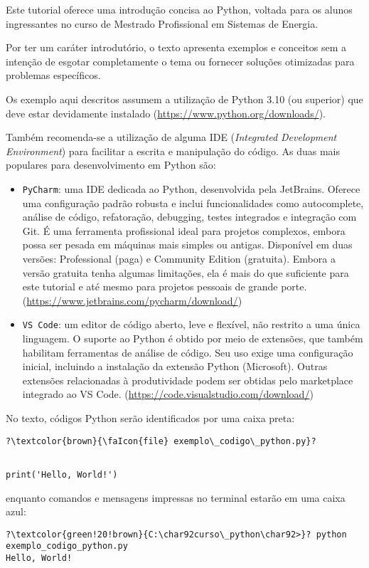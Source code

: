 
Este tutorial oferece uma introdução concisa ao Python, voltada para os alunos ingressantes no curso de Mestrado
Profissional em Sistemas de Energia.

Por ter um caráter introdutório, o texto apresenta exemplos e conceitos sem a intenção de esgotar completamente o
tema ou fornecer soluções otimizadas para problemas específicos.

Os exemplo aqui descritos assumem a utilização de Python 3.10 (ou superior) que deve estar devidamente instalado (\url{https://www.python.org/downloads/}).

Também recomenda-se a utilização de alguma IDE (\emph{Integrated Development Environment}) para facilitar a escrita e manipulação do código.
As duas mais populares para desenvolvimento em Python são:
\begin{itemize}
    \item \texttt{PyCharm}: uma IDE dedicada ao Python, desenvolvida pela JetBrains.
    Oferece uma configuração padrão robusta e inclui funcionalidades como autocomplete, análise de código, refatoração,
    debugging, testes integrados e integração com Git.
    É uma ferramenta profissional ideal para projetos complexos, embora possa ser pesada em máquinas mais simples ou antigas.
    Disponível em duas versões: Professional (paga) e Community Edition (gratuita).
    Embora a versão gratuita tenha algumas limitações, ela é mais do que suficiente para este tutorial e até mesmo para projetos pessoais de grande porte.
    (\url{https://www.jetbrains.com/pycharm/download/})
    \item \texttt{VS Code}: um editor de código aberto, leve e flexível, não restrito a uma única linguagem.
    O suporte ao Python é obtido por meio de extensões, que também habilitam ferramentas de análise de código.
    Seu uso exige uma configuração inicial, incluindo a instalação da extensão Python (Microsoft).
    Outras extensões relacionadas à produtividade podem ser obtidas pelo marketplace integrado ao VS Code.
    (\url{https://code.visualstudio.com/download/})
\end{itemize}


No texto, códigos Python serão identificados por uma caixa preta:
\begin{verbatim}
?\textcolor{brown}{\faIcon{file} exemplo\_codigo\_python.py}?
\end{verbatim}
\vspace{-0.8em}
%
\begin{verbatim}

print('Hello, World!')
\end{verbatim}

enquanto comandos e mensagens impressas no terminal estarão em uma caixa azul:
\begin{verbatim}
?\textcolor{green!20!brown}{C:\char92curso\_python\char92>}? python exemplo_codigo_python.py
Hello, World!
\end{verbatim}